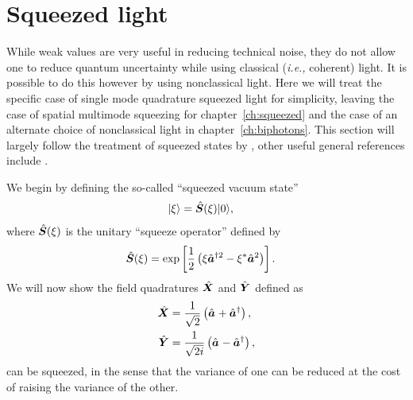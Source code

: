 \section{Squeezed light}
While weak values are very useful in reducing technical noise, they do not allow one to reduce quantum uncertainty while using classical (\emph{i.e.,} coherent) light.  It is possible to do this however by using nonclassical light.  Here we will treat the specific case of single mode quadrature squeezed light for simplicity, leaving the case of spatial multimode squeezing for chapter~\ref{ch:squeezed} and the case of an alternate choice of nonclassical light in chapter~\ref{ch:biphotons}.  This section will largely follow the treatment of squeezed states by \cite{Agarwal2013}, other useful general references include \cite{Mandel1995, Loudon2000}.

We begin by defining the so-called ``squeezed vacuum state''
\begin{align}
  \lvert \xi\rangle &= \hat{\bm S}(\xi)\lvert 0\rangle,
\end{align}
where $\hat{\bm S}(\xi)$ is the unitary ``squeeze operator'' defined by
\begin{align}
  \hat{\bm S}(\xi) &= \exp\left[\frac{1}{2}\left(\xi\hat{\bm a}^{\dagger 2} - \xi^{*}\hat{\bm a}^2 \right) \right].
\end{align}
We will now show the field quadratures $\hat{\bm X}$ and $\hat{\bm Y}$ defined as
\begin{align}\label{eq:quadratures}
  \hat{\bm X} &= \frac{1}{\sqrt{2}} \left(\hat{\bm a}_{} + \hat{\bm a}^\dagger_{} \right), \nonumber \\
  \hat{\bm Y} &= \frac{1}{\sqrt{2i}} \left(\hat{\bm a}_{} - \hat{\bm a}^\dagger_{} \right),
\end{align}
can be squeezed, in the sense that the variance of one can be reduced at the cost of raising the variance of the other.

